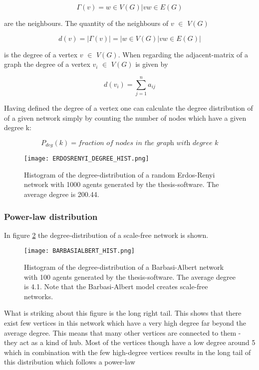 \documentclass[../Bachelorarbeit.tex]{subfiles}
\begin{document}
\begin{equation}
\Gamma(v) = {w \in V(G) | vw \in E(G)}
\end{equation}

are the neighbours. The quantity of the neighbours of $v$ $\in$ $V(G)$ 

\begin{equation}
d(v) = |\Gamma(v)| = |{w \in V(G) | vw \in E(G)}|
\end{equation}

is the degree of a vertex $v$ $\in$ $V(G)$. When regarding the adjacent-matrix of a graph the degree of a vertex $v_i$ $\in$ $V(G)$ is given by

\begin{equation}
d(v_i) = \displaystyle\sum_{j=1}^{n} a_{ij}
\end{equation}

Having defined the degree of a vertex one can calculate the degree distribution of of a given network simply by counting the number of nodes which have a given degree k:

\begin{equation}
P_{deg}(k) = \textit{fraction of nodes in the graph with degree k}
\end{equation}

\begin{figure}[H]
	\centering
  \texttt{[image: ERDOSRENYI\_DEGREE\_HIST.png]}
  	\caption{Histogram of the degree-distribution of a random Erdos-Renyi network with 1000 agents generated by the thesis-software. The average degree is 200.44.}
	\label{fig:ERDOSRENYI_DEGREE_HIST}
\end{figure}

\subsubsection{Power-law distribution}
In figure \ref{fig:BARBASIALBERT_HIST} the degree-distribution of a scale-free network is shown.

\begin{figure}[H]
	\centering
  \texttt{[image: BARBASIALBERT\_HIST.png]}
  	\caption{Histogram of the degree-distribution of a Barbasi-Albert network with 100 agents generated by the thesis-software. The average degree is 4.1. Note that the Barbasi-Albert model creates scale-free networks.}
	\label{fig:BARBASIALBERT_HIST}
\end{figure}

What is striking about this figure is the long right tail. This shows that there exist few vertices in this network which have a very high degree far beyond the average degree. This means that many other vertices are connected to them - they act as a kind of hub. Most of the vertices though have a low degree around 5 which in combination with the few high-degree vertices results in the long tail of this distribution which follows a power-law
\end{document}
